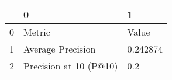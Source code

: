 \begin{tabular}{lll}
\toprule
{} &                       0 &         1 \\
\midrule
0 &                  Metric &     Value \\
1 &       Average Precision &  0.242874 \\
2 &  Precision at 10 (P@10) &       0.2 \\
\bottomrule
\end{tabular}
